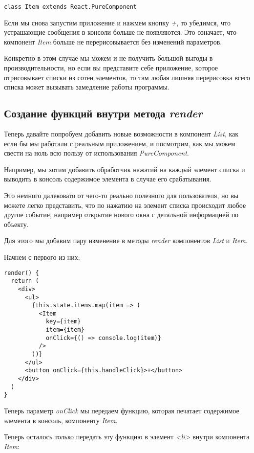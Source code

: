 \begin{lstlisting}
class Item extends React.PureComponent
\end{lstlisting}

Если мы снова запустим приложение и нажмем кнопку \textit{+}, то убедимся, что устрашающие сообщения в консоли больше не появляются. Это означает, что компонент \textit{Item} больше не перерисовывается без изменений параметров.

Конкретно в этом случае мы можем и не получить большой выгоды в производительности, но если вы представите себе приложение, которое отрисовывает списки из сотен элементов, то там любая лишняя перерисовка всего списка может вызывать замедление работы программы.

\subsection{Создание функций внутри метода \textit{render}}

Теперь давайте попробуем добавить новые возможности в компонент \textit{List}, как если бы мы работали с реальным приложением, и посмотрим, как мы можем свести на ноль всю пользу от использования \textit{PureComponent}.

Например, мы хотим добавить обработчик нажатий на каждый элемент списка и выводить в консоль содержимое элемента в случае его срабатывания.

Это немного далековато от чего-то реально полезного для пользователя, но вы можете легко представить, что по нажатию на элемент списка происходит любое другое событие, например открытие нового окна с детальной информацией по объекту.

Для этого мы добавим пару изменение в методы \textit{render} компонентов \textit{List} и \textit{Item}.

Начнем с первого из них:

\begin{lstlisting}
render() {
  return (
    <div>
      <ul>
        {this.state.items.map(item => (
          <Item
            key={item}
            item={item}
            onClick={() => console.log(item)}
          />
        ))}
      </ul>
      <button onClick={this.handleClick}>+</button>
    </div>
  )
}
\end{lstlisting}

Теперь параметр \textit{onClick} мы передаем функцию, которая печатает содержимое элемента в консоль, компоненту \textit{Item}.

Теперь осталось только передать эту функцию в элемент \textit{<li>} внутри компонента \textit{Item}:

